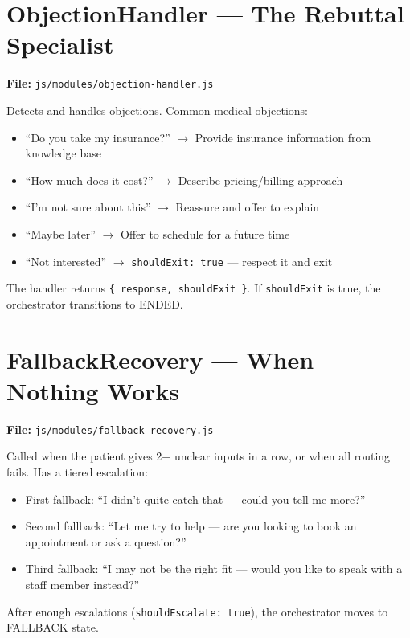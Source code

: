 \documentclass[12pt, a4paper]{report}
\newcommand{\ic}[1]{\texttt{\small\color{accentblue!70!black}#1}}
\begin{document}
\section{ObjectionHandler --- The Rebuttal Specialist}

\textbf{File:} \ic{js/modules/objection-handler.js}

Detects and handles objections. Common medical objections:
\begin{itemize}
  \item ``Do you take my insurance?'' $\to$ Provide insurance information from knowledge
        base
  \item ``How much does it cost?'' $\to$ Describe pricing/billing approach
  \item ``I'm not sure about this'' $\to$ Reassure and offer to explain
  \item ``Maybe later'' $\to$ Offer to schedule for a future time
  \item ``Not interested'' $\to$ \ic{shouldExit: true} --- respect it and exit
\end{itemize}

The handler returns \ic{\{ response, shouldExit \}}. If \ic{shouldExit} is true, the
orchestrator transitions to ENDED.

\section{FallbackRecovery --- When Nothing Works}

\textbf{File:} \ic{js/modules/fallback-recovery.js}

Called when the patient gives 2+ unclear inputs in a row, or when all routing fails.
Has a tiered escalation:
\begin{itemize}
  \item First fallback: ``I didn't quite catch that --- could you tell me more?''
  \item Second fallback: ``Let me try to help --- are you looking to book an appointment
        or ask a question?''
  \item Third fallback: ``I may not be the right fit --- would you like to speak with a
        staff member instead?''
\end{itemize}

After enough escalations (\ic{shouldEscalate: true}), the orchestrator moves to FALLBACK
state.

\end{document}
